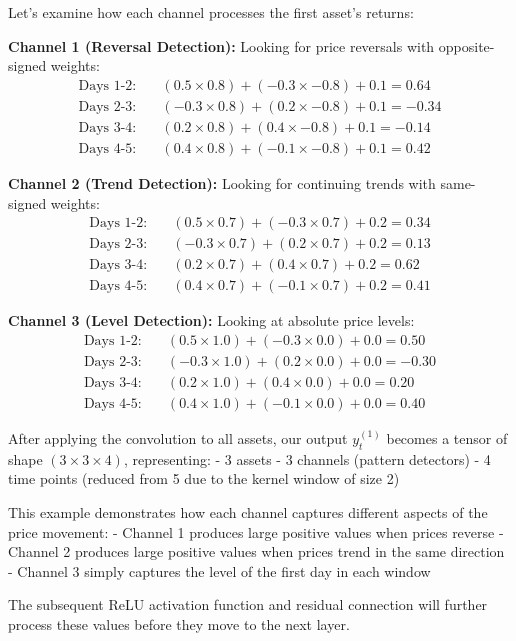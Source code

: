 \documentclass[12pt,article]{memoir}
\begin{document}
{Let's examine how each channel processes the first asset's returns:

\textbf{Channel 1 (Reversal Detection):}
Looking for price reversals with opposite-signed weights:
\begin{align*}
\text{Days 1-2:} & \quad (0.5 \times 0.8) + (-0.3 \times -0.8) + 0.1 = 0.64 \\
\text{Days 2-3:} & \quad (-0.3 \times 0.8) + (0.2 \times -0.8) + 0.1 = -0.34 \\
\text{Days 3-4:} & \quad (0.2 \times 0.8) + (0.4 \times -0.8) + 0.1 = -0.14 \\
\text{Days 4-5:} & \quad (0.4 \times 0.8) + (-0.1 \times -0.8) + 0.1 = 0.42
\end{align*}

\textbf{Channel 2 (Trend Detection):}
Looking for continuing trends with same-signed weights:
\begin{align*}
\text{Days 1-2:} & \quad (0.5 \times 0.7) + (-0.3 \times 0.7) + 0.2 = 0.34 \\
\text{Days 2-3:} & \quad (-0.3 \times 0.7) + (0.2 \times 0.7) + 0.2 = 0.13 \\
\text{Days 3-4:} & \quad (0.2 \times 0.7) + (0.4 \times 0.7) + 0.2 = 0.62 \\
\text{Days 4-5:} & \quad (0.4 \times 0.7) + (-0.1 \times 0.7) + 0.2 = 0.41
\end{align*}

\textbf{Channel 3 (Level Detection):}
Looking at absolute price levels:
\begin{align*}
\text{Days 1-2:} & \quad (0.5 \times 1.0) + (-0.3 \times 0.0) + 0.0 = 0.50 \\
\text{Days 2-3:} & \quad (-0.3 \times 1.0) + (0.2 \times 0.0) + 0.0 = -0.30 \\
\text{Days 3-4:} & \quad (0.2 \times 1.0) + (0.4 \times 0.0) + 0.0 = 0.20 \\
\text{Days 4-5:} & \quad (0.4 \times 1.0) + (-0.1 \times 0.0) + 0.0 = 0.40
\end{align*}

After applying the convolution to all assets, our output $y_t^{(1)}$ becomes a tensor of shape $(3 \times 3 \times 4)$, representing:
- 3 assets
- 3 channels (pattern detectors)
- 4 time points (reduced from 5 due to the kernel window of size 2)

This example demonstrates how each channel captures different aspects of the price movement:
- Channel 1 produces large positive values when prices reverse
- Channel 2 produces large positive values when prices trend in the same direction
- Channel 3 simply captures the level of the first day in each window

The subsequent ReLU activation function and residual connection will further process these values before they move to the next layer.
}
\end{document}
